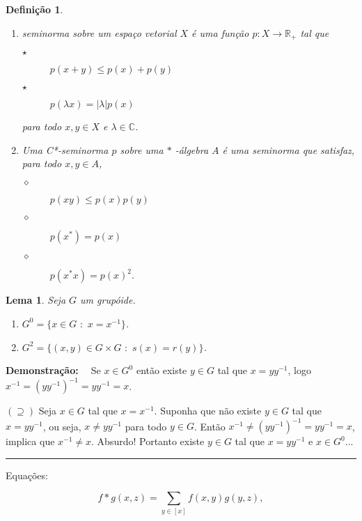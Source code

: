 \documentclass[
	12pt,				%
	oneside,			%
	a4paper,			%
	english,			%
	french,				%
	spanish,			%
	brazil,				%
	]{abntex2}
\newcommand{\R}{\ensuremath {\mathbb{R}} }
\newcommand{\C}{\ensuremath {\mathbb{C}} }
\theoremstyle{plain}
\newtheorem{lema}{Lema}[chapter]
\newtheorem{defi}{Definição}[chapter]
\theoremstyle{definition}
\newenvironment{dem}[1][\textbf{Demonstração:} \ ]{\textbf{#1}}{\hfill\rule{2mm}{2mm}}
\begin{document}
\begin{defi}\
\begin{enumerate}
\renewcommand{\labelenumi}{(\alph{enumi})} %
\item  seminorma sobre um espaço vetorial $X$ é uma função $p: X \rightarrow \R_{+}$ tal que
\begin{description}
\item[$\star$] $p(x+y)\leq p(x)+p(y)$
\item[$\star$] $p(\lambda x)= |\lambda|p(x)$
\end{description}
para todo $x, y \in X$ e $\lambda \in \C$. \\
\item  Uma C*-seminorma $p$ sobre uma $\ast$ -álgebra $A$ é uma seminorma que satisfaz, para todo $x, y \in A$,
\begin{description}
\item[$\diamond$] $p(xy)\leq p(x)p(y)$
\item[$\diamond$] $p(x^*)=p(x)$
\item[$\diamond$] $p(x^*x)=p(x)^2.$
\end{description}
\end{enumerate}
\end{defi}


\begin{lema} 
Seja $G$ um grupóide.
\renewcommand{\labelenumi}{(\roman{enumi})} %
\begin{enumerate}
  \item $G^0 = \{x \in G \,\, : \,\, x=x^{-1}\}$.
  \item $G^2=\{(x,y) \in G \times G \,\, : \,\, s(x)=r(y)\}$.
\end{enumerate}
\end{lema}


\noindent \begin{dem} 
Se $x \in G^0$ então existe $y \in G$ tal que $x=yy^{-1}$, logo $x^{-1}=(yy^{-1})^{-1}= yy^{-1}=x$. 
\par $(\supseteq)$ Seja $x \in G$ tal que $x=x^{-1}$. Suponha que não existe $y \in G$ tal que $x=yy^{-1}$, ou seja, $x \neq yy^{-1}$ para todo $y \in G$. Então $x^{-1} \neq (yy^{-1})^{-1}=yy^{-1}=x$, implica que $x^{-1}\neq x$. Absurdo! Portanto existe $y \in G$ tal que $x=yy^{-1}$ e $x \in G^0$...
\end{dem}


Equações:

\begin{equation}\label{produto}  
f \ast g (x,z) = \sum_{y \in [x]} f(x,y)g(y,z),
\end{equation}
\end{document}
